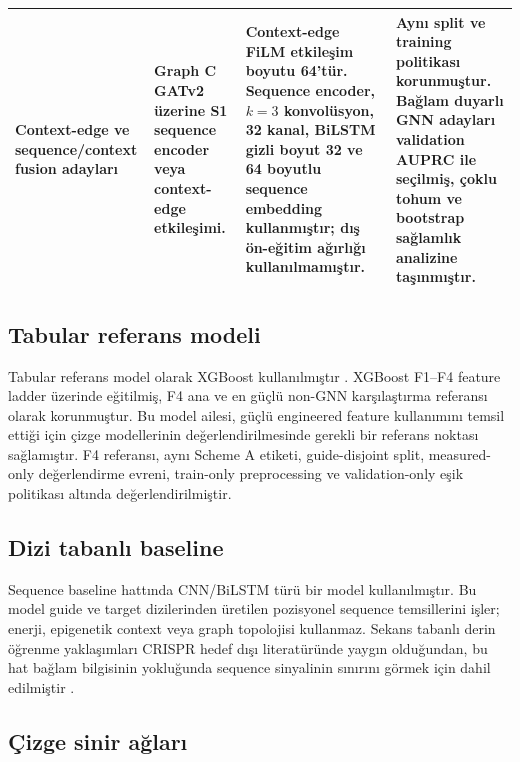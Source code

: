 \begin{table}[htbp]
\begin{tabularx}{\textwidth}{>{\raggedright\arraybackslash}p{} >{\raggedright\arraybackslash}p{} >{\raggedright\arraybackslash}p{} >{\raggedright\arraybackslash}X}
Context-edge ve sequence/context fusion adayları & Graph C GATv2 üzerine S1 sequence encoder veya context-edge etkileşimi. & Context-edge FiLM etkileşim boyutu 64'tür. Sequence encoder, \(k=3\) konvolüsyon, 32 kanal, BiLSTM gizli boyut 32 ve 64 boyutlu sequence embedding kullanmıştır; dış ön-eğitim ağırlığı kullanılmamıştır. & Aynı split ve training politikası korunmuştur. Bağlam duyarlı GNN adayları validation AUPRC ile seçilmiş, çoklu tohum ve bootstrap sağlamlık analizine taşınmıştır.\\
\bottomrule
\end{tabularx}
\end{table}

\subsection{Tabular referans modeli}

Tabular referans model olarak XGBoost kullanılmıştır . XGBoost F1--F4 feature ladder üzerinde eğitilmiş, F4 ana ve en güçlü non-GNN karşılaştırma referansı olarak korunmuştur. Bu model ailesi, güçlü engineered feature kullanımını temsil ettiği için çizge modellerinin değerlendirilmesinde gerekli bir referans noktası sağlamıştır. F4 referansı, aynı Scheme A etiketi, guide-disjoint split, measured-only değerlendirme evreni, train-only preprocessing ve validation-only eşik politikası altında değerlendirilmiştir.

\subsection{Dizi tabanlı baseline}

Sequence baseline hattında CNN/BiLSTM türü bir model kullanılmıştır. Bu model guide ve target dizilerinden üretilen pozisyonel sequence temsillerini işler; enerji, epigenetik context veya graph topolojisi kullanmaz. Sekans tabanlı derin öğrenme yaklaşımları CRISPR hedef dışı literatüründe yaygın olduğundan, bu hat bağlam bilgisinin yokluğunda sequence sinyalinin sınırını görmek için dahil edilmiştir .

\subsection{Çizge sinir ağları}

